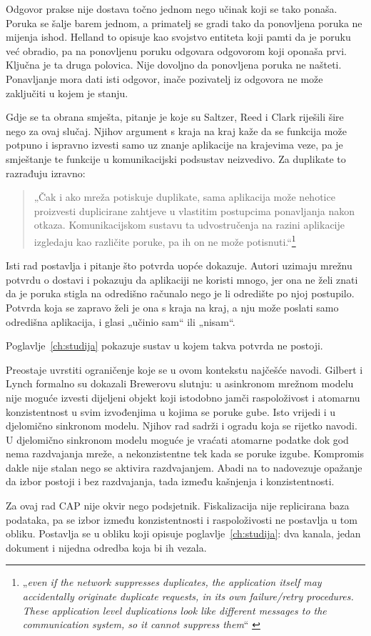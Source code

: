 Odgovor prakse nije dostava točno jednom nego učinak koji se tako ponaša.
Poruka se šalje barem jednom, a primatelj se gradi tako da ponovljena
poruka ne mijenja ishod. Helland to opisuje kao svojstvo entiteta koji
pamti da je poruku već obradio, pa na ponovljenu poruku odgovara odgovorom
koji oponaša prvi\cite{helland2007lifebeyond}. Ključna je ta druga
polovica. Nije dovoljno da ponovljena poruka ne našteti. Ponavljanje mora
dati isti odgovor, inače pozivatelj iz odgovora ne može zaključiti u kojem
je stanju.

Gdje se ta obrana smješta, pitanje je koje su Saltzer, Reed i Clark
riješili šire nego za ovaj slučaj\cite{saltzer1984endtoend}. Njihov
argument s kraja na kraj kaže da se funkcija može potpuno i ispravno
izvesti samo uz znanje aplikacije na krajevima veze, pa je smještanje te
funkcije u komunikacijski podsustav neizvedivo. Za duplikate to razrađuju
izravno:

\begin{quote}
„Čak i ako mreža potiskuje duplikate, sama aplikacija može nehotice
proizvesti duplicirane zahtjeve u vlastitim postupcima ponavljanja nakon
otkaza. Komunikacijskom sustavu ta udvostručenja na razini aplikacije
izgledaju kao različite poruke, pa ih on ne može
potisnuti.“\footnote{„\emph{even if the network suppresses duplicates, the
application itself may accidentally originate duplicate requests, in its
own failure/retry procedures. These application level duplications look
like different messages to the communication system, so it cannot suppress
them}“ \cite{saltzer1984endtoend}} \end{quote}

Isti rad postavlja i pitanje što potvrda uopće dokazuje. Autori uzimaju
mrežnu potvrdu o dostavi i pokazuju da aplikaciji ne koristi mnogo, jer
ona ne želi znati da je poruka stigla na odredišno računalo nego je li
odredište po njoj postupilo. Potvrda koja se zapravo želi je ona s kraja
na kraj, a nju može poslati samo odredišna aplikacija, i glasi „učinio sam“
ili „nisam“.

Poglavlje~\ref{ch:studija} pokazuje sustav u kojem takva potvrda ne postoji.

Preostaje uvrstiti ograničenje koje se u ovom kontekstu najčešće navodi.
Gilbert i Lynch formalno su dokazali Brewerovu slutnju: u asinkronom
mrežnom modelu nije moguće izvesti dijeljeni objekt koji istodobno jamči
raspoloživost i atomarnu konzistentnost u svim izvođenjima u kojima se
poruke gube\cite{gilbert2002brewer}. Isto vrijedi i u djelomično sinkronom
modelu. Njihov rad sadrži i ogradu koja se rijetko navodi. U djelomično
sinkronom modelu moguće je vraćati atomarne podatke dok god nema
razdvajanja mreže, a nekonzistentne tek kada se poruke izgube. Kompromis
dakle nije stalan nego se aktivira razdvajanjem. Abadi na to nadovezuje
opažanje da izbor postoji i bez razdvajanja, tada između kašnjenja i
konzistentnosti\cite{abadi2012consistency}.

Za ovaj rad CAP nije okvir nego podsjetnik. Fiskalizacija nije replicirana
baza podataka, pa se izbor između konzistentnosti i raspoloživosti ne
postavlja u tom obliku. Postavlja se u obliku koji opisuje
poglavlje~\ref{ch:studija}: dva kanala, jedan dokument i nijedna odredba
koja bi ih vezala.
